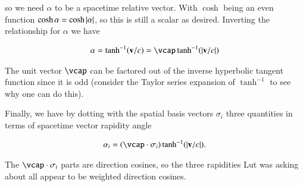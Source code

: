 so we need $\alpha$ to be a spacetime relative vector.  With $\cosh$ being an even function $\cosh{\alpha} = \cosh{\left\lvert{\alpha}\right\rvert}$, so this
is still a 
scalar as desired.  Inverting the relationship for $\alpha$ we have

\begin{align*}
\alpha = \tanh^{-1} (\Bv/c) = \vcap \tanh^{-1} (\Abs{\Bv/c})
\end{align*}

The unit vector $\vcap$ can be factored out of the inverse hyperbolic tangent function since it is odd (consider the Taylor series expansion of $\tanh^{-1}$ to see why one can do this).

Finally, we have by 
dotting with the spatial basis vectors $\sigma_i$ three quantities in terms of spacetime vector rapidity angle

\begin{align*}
\alpha_i = (\vcap \cdot \sigma_i) \tanh^{-1} (\Abs{\Bv/c}).
\end{align*}

The $\vcap \cdot \sigma_i$ parts are direction cosines, so the three rapidities Lut was asking about all appear to be weighted direction cosines.

%
%

%
